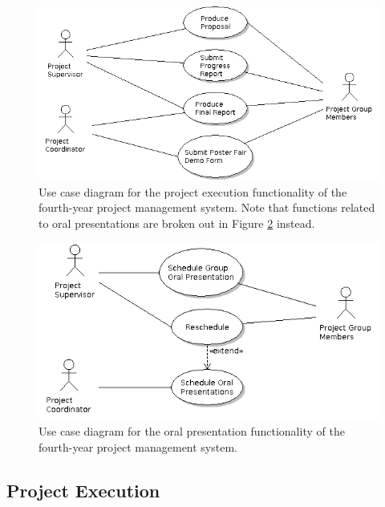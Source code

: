 \begin{figure}[!ht]
\centering \includegraphics[width=6in]{./img/case-study-fourth-year-system/project-lifecycle}
\caption{Use case diagram for the project execution functionality of the fourth-year project management system. Note that functions related to oral presentations are broken out in Figure \ref{fig:case-4ys-use-case-oral-reports} instead.}
\label{fig:case-4ys-use-case-project-lifecycle}
\end{figure}

\begin{figure}[!ht]
\centering \includegraphics[width=6in]{./img/case-study-fourth-year-system/oral-report-scheduling}
\caption{Use case diagram for the oral presentation functionality of the fourth-year project management system.}
\label{fig:case-4ys-use-case-oral-reports}
\end{figure}


\FloatBarrier

\subsection{Project Execution}

